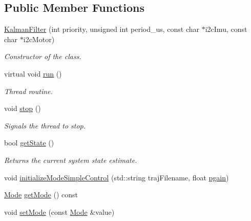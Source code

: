 \subsection*{\-Public \-Member \-Functions}
\begin{DoxyCompactItemize}
\item 
\hyperlink{class_u_s_u_1_1_kalman_filter_a65e87c695dac9877015a2ace1471fdc2}{\-Kalman\-Filter} (int priority, unsigned int period\-\_\-us, const char $\ast$i2c\-Imu, const char $\ast$i2c\-Motor)
\begin{DoxyCompactList}\small\item\em \-Constructor of the class. \end{DoxyCompactList}\item 
virtual void \hyperlink{class_u_s_u_1_1_kalman_filter_a47cc7f620b57b25133289e61dbf2a7be}{run} ()
\begin{DoxyCompactList}\small\item\em \-Thread routine. \end{DoxyCompactList}\item 
void \hyperlink{class_u_s_u_1_1_kalman_filter_a3f8b3ce719dcb24745150f8c4ef361b8}{stop} ()
\begin{DoxyCompactList}\small\item\em \-Signals the thread to stop. \end{DoxyCompactList}\item 
bool \hyperlink{class_u_s_u_1_1_kalman_filter_a3ed1c15b5301f0840f6a7a3d7696fb0a}{get\-State} ()
\begin{DoxyCompactList}\small\item\em \-Returns the current system state estimate. \end{DoxyCompactList}\item 
void \hyperlink{class_u_s_u_1_1_kalman_filter_a6c69033cc4bddf2b6bd109286e6accb5}{initialize\-Mode\-Simple\-Control} (std\-::string traj\-Filename, float \hyperlink{main_8cpp_a6570ed64e8a5f38d9e01122b85d550a9}{pgain})
\item 
\hyperlink{class_u_s_u_1_1_kalman_filter_ab42b5998c23e20c32775873af96ce8c8}{\-Mode} \hyperlink{class_u_s_u_1_1_kalman_filter_a12bf3159b91b38c82aebf139f1fa0497}{get\-Mode} () const 
\item 
void \hyperlink{class_u_s_u_1_1_kalman_filter_a5e37575b2560b521fd3462a3f207e0e7}{set\-Mode} (const \hyperlink{class_u_s_u_1_1_kalman_filter_ab42b5998c23e20c32775873af96ce8c8}{\-Mode} \&value)
\end{DoxyCompactItemize}


